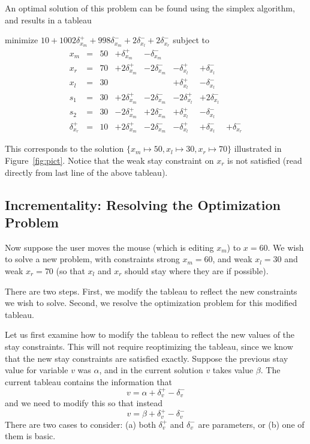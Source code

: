 \documentclass{article}
\newcommand{\strength}{\sf}
\begin{document}
An optimal solution of this problem can be found using the simplex algorithm,
and results in a tableau
\begin{trivlist}\item
minimize $10 + 1002 \delta_{x_m}^+ + 998 \delta_{x_m}^-  + 2
\delta_{x_l}^- + 2\delta_{x_r}^- $ 
subject to 
$$
\begin{array}{rlrrrrrr} 
x_m & = &50 &  + \delta_{x_m}^+ & - \delta_{x_m}^- \\
x_r & = &70 & + 2 \delta_{x_m}^+ & - 2\delta_{x_m}^- &
                - \delta_{x_l}^+ & + \delta_{x_l}^- \\ \hline
x_l & = & 30  & & & + \delta_{x_l}^+ & - \delta_{x_l}^- \\
s_1 & = &30 &  + 2 \delta_{x_m}^+ & - 2\delta_{x_m}^- &
                -2 \delta_{x_l}^+ & +2 \delta_{x_l}^- \\
s_2 & = &30 &   - 2 \delta_{x_m}^+ &+2\delta_{x_m}^- &
                + \delta_{x_l}^+ & - \delta_{x_l}^- \\
\delta_{x_r}^+ & = & 10 & + 2 \delta_{x_m}^+  & - 2\delta_{x_m}^- &
        - \delta_{x_l}^+ & + \delta_{x_l}^- & +\delta_{x_r}^-
\end{array}
$$
\end{trivlist}
This corresponds to the solution
$\{x_m \mapsto 50, x_l \mapsto 30, x_r \mapsto 70\}$
illustrated in Figure~\ref{fig:pict}.
Notice that the weak stay constraint on $x_r$ is not satisfied (read
directly from last line of the above tableau).

\subsection{Incrementality: Resolving the Optimization Problem}
\label{resolving}

Now suppose the user moves the mouse (which
is editing $x_m$) to $x=60$.
We wish to solve a new problem, with
constraints {\strength strong} $x_m = 60$, and
{\strength weak} $x_l = 30$ and {\strength weak} $x_r = 70$
(so that $x_l$ and $x_r$ should stay where they are if possible).


There are two steps.  First, we modify the tableau to reflect the new
constraints we wish to solve.  Second, we resolve the optimization problem
for this modified tableau.

Let us first examine how to modify the tableau to reflect the new values of
the stay constraints.  This will not require reoptimizing the tableau,
since we know that the new stay constraints are satisfied exactly.
Suppose the previous stay value for variable $v$ was $\alpha$, and in the
current solution $v$ takes value $\beta$.  The current tableau contains the
information that 
$$v = \alpha + \delta_v^+ - \delta_v^-$$
and we need to
modify this so that instead 
$$v = \beta + \delta_v^+ - \delta_v^-$$
There
are two cases to consider: (a) both $\delta_v^+$ and $\delta_v^-$ are
parameters, or (b) one of them is basic.
\end{document}
